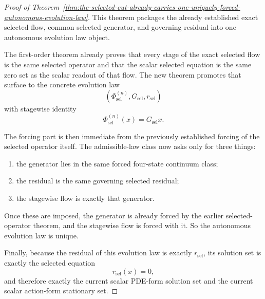 \begin{proof}[Proof of Theorem~\ref{thm:the-selected-cut-already-carries-one-uniquely-forced-autonomous-evolution-law}]
\label{proof:thm:the-selected-cut-already-carries-one-uniquely-forced-autonomous-evolution-law}
This theorem packages the already established exact selected flow, common
selected generator, and governing residual into one autonomous evolution law
object.

The first-order theorem already proves that every stage of the exact selected
flow is the same selected operator and that the scalar selected equation is the
same zero set as the scalar readout of that flow. The new theorem promotes
that surface to the concrete evolution law
\[
(\Phi_{\mathrm{sel}}^{(n)},G_{\mathrm{sel}},r_{\mathrm{sel}})
\]
with stagewise identity
\[
\Phi_{\mathrm{sel}}^{(n)}(x)=G_{\mathrm{sel}}x.
\]

The forcing part is then immediate from the previously established forcing of
the selected operator itself. The admissible-law class now asks only for three
things:
\begin{enumerate}
\item the generator lies in the same forced four-state continuum class;
\item the residual is the same governing selected residual;
\item the stagewise flow is exactly that generator.
\end{enumerate}
Once these are imposed, the generator is already forced by the earlier
selected-operator theorem, and the stagewise flow is forced with it. So the
autonomous evolution law is unique.

Finally, because the residual of this evolution law is exactly
\(r_{\mathrm{sel}}\), its solution set is exactly the selected equation
\[
r_{\mathrm{sel}}(x)=0,
\]
and therefore exactly the current scalar PDE-form solution set and the current
scalar action-form stationary set.
\end{proof}

